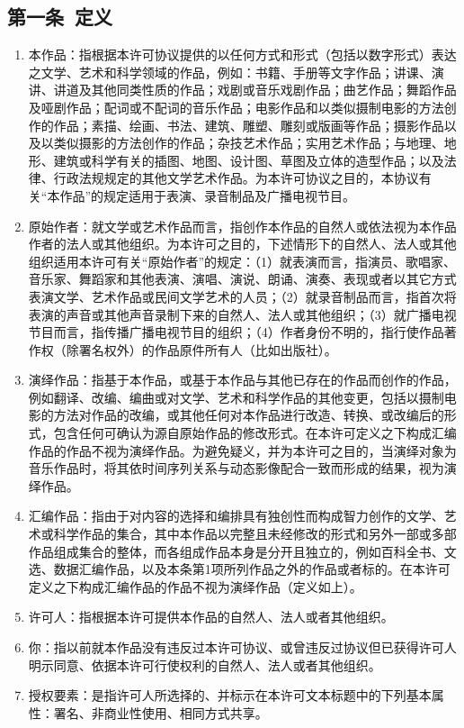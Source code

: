 \subsection{第一条\ 定义} 
\begin{enumerate}
	\item 本作品：指根据本许可协议提供的以任何方式和形式（包括以数字形式）表达之文学、艺术和科学领域的作品，例如：书籍、手册等文字作品；讲课、演讲、讲道及其他同类性质的作品；戏剧或音乐戏剧作品；曲艺作品；舞蹈作品及哑剧作品；配词或不配词的音乐作品；电影作品和以类似摄制电影的方法创作的作品；素描、绘画、书法、建筑、雕塑、雕刻或版画等作品；摄影作品以及以类似摄影的方法创作的作品；杂技艺术作品；实用艺术作品；与地理、地形、建筑或科学有关的插图、地图、设计图、草图及立体的造型作品；以及法律、行政法规规定的其他文学艺术作品。为本许可协议之目的，本协议有关“本作品”的规定适用于表演、录音制品及广播电视节目。 
	\item 原始作者：就文学或艺术作品而言，指创作本作品的自然人或依法视为本作品作者的法人或其他组织。为本许可之目的，下述情形下的自然人、法人或其他组织适用本许可有关“原始作者”的规定：（1）就表演而言，指演员、歌唱家、音乐家、舞蹈家和其他表演、演唱、演说、朗诵、演奏、表现或者以其它方式表演文学、艺术作品或民间文学艺术的人员；（2）就录音制品而言，指首次将表演的声音或其他声音录制下来的自然人、法人或其他组织；（3）就广播电视节目而言，指传播广播电视节目的组织；（4）作者身份不明的，指行使作品著作权（除署名权外）的作品原件所有人（比如出版社）。
	\item 演绎作品：指基于本作品，或基于本作品与其他已存在的作品而创作的作品，例如翻译、改编、编曲或对文学、艺术和科学作品的其他变更，包括以摄制电影的方法对作品的改编，或其他任何对本作品进行改造、转换、或改编后的形式，包含任何可确认为源自原始作品的修改形式。在本许可定义之下构成汇编作品的作品不视为演绎作品。为避免疑义，并为本许可之目的，当演绎对象为音乐作品时，将其依时间序列关系与动态影像配合一致而形成的结果，视为演绎作品。
	\item 汇编作品：指由于对内容的选择和编排具有独创性而构成智力创作的文学、艺术或科学作品的集合，其中本作品以完整且未经修改的形式和另外一部或多部作品组成集合的整体，而各组成作品本身是分开且独立的，例如百科全书、文选、数据汇编作品，以及本条第1项所列作品之外的作品或者标的。在本许可定义之下构成汇编作品的作品不视为演绎作品（定义如上）。
	\item 许可人：指根据本许可提供本作品的自然人、法人或者其他组织。
	\item 你：指以前就本作品没有违反过本许可协议、或曾违反过协议但已获得许可人明示同意、依据本许可行使权利的自然人、法人或者其他组织。
	\item 授权要素：是指许可人所选择的、并标示在本许可文本标题中的下列基本属性：署名、非商业性使用、相同方式共享。

\end{enumerate}

